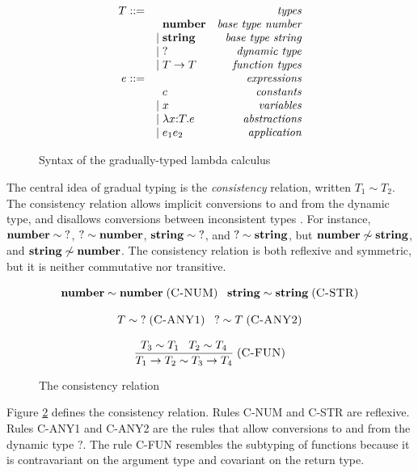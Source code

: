 \begin{figure}[!ht]
\dstart
$$
\begin{array}{rlr}
T ::= & & \emph{types}\\
& \;\; \mathbf{number} & \emph{base type number}\\
& | \; \mathbf{string} & \emph{base type string}\\
& | \; ? & \emph{dynamic type}\\
& | \; T \rightarrow T & \emph{function types}\\
e ::= & & \emph{expressions}\\
& \;\; c & \emph{constants}\\
& | \; x & \emph{variables}\\
& | \; \lambda x{:}T{.}e & \emph{abstractions}\\
& | \; e_{1} e_{2} & \emph{application}
\end{array}
$$
\dend
\caption{Syntax of the gradually-typed lambda calculus}
\label{fig:gtlc}
\end{figure}

The central idea of gradual typing is the \emph{consistency}
relation, written $T_{1} \sim T_{2}$.
The consistency relation allows implicit conversions to and from the
dynamic type, and disallows conversions between inconsistent types
\citep{siek2006gradual}.
For instance, $\mathbf{number} \sim \;?$, $? \sim \mathbf{number}$,
$\mathbf{string} \sim \;?$, and $? \sim \mathbf{string}$,
but $\mathbf{number} \not\sim \mathbf{string}$, and
$\mathbf{string} \not\sim \mathbf{number}$.
The consistency relation is both reflexive and symmetric, but
it is neither commutative nor transitive.

\begin{figure}[!ht]
\dstart
$$
\begin{matrix}
\mathbf{number} \sim \mathbf{number} \; (\textsc{C-NUM}) \;\;\; \mathbf{string} \sim \mathbf{string} \; (\textsc{C-STR})
\\ \\
T \sim \;? \; (\textsc{C-ANY1}) \;\;\; ? \sim T \; (\textsc{C-ANY2})
\\ \\
\dfrac{T_{3} \sim T_{1} \;\;\; T_{2} \sim T_{4}}
      {T_{1} \rightarrow T_{2} \sim T_{3} \rightarrow T_{4}} \; (\textsc{C-FUN})
\end{matrix}
$$
\dend
\caption{The consistency relation}
\label{fig:consistency}
\end{figure}

Figure \ref{fig:consistency} defines the consistency relation.
Rules \textsc{C-NUM} and \textsc{C-STR} are reflexive. 
Rules \textsc{C-ANY1} and \textsc{C-ANY2} are the rules that allow
conversions to and from the dynamic type $?$.
The rule \textsc{C-FUN} resembles the subtyping of functions
because it is contravariant on the argument type and covariant on the
return type.

